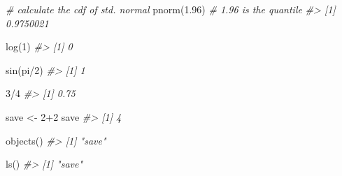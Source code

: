 \documentclass[
]{book}
\newenvironment{Shaded}{\begin{snugshade}}{\end{snugshade}}
\newcommand{\CommentTok}[1]{\textcolor[rgb]{0.56,0.35,0.01}{\textit{#1}}}
\newcommand{\DecValTok}[1]{\textcolor[rgb]{0.00,0.00,0.81}{#1}}
\newcommand{\FloatTok}[1]{\textcolor[rgb]{0.00,0.00,0.81}{#1}}
\newcommand{\FunctionTok}[1]{\textcolor[rgb]{0.00,0.00,0.00}{#1}}
\newcommand{\NormalTok}[1]{#1}
\newcommand{\OtherTok}[1]{\textcolor[rgb]{0.56,0.35,0.01}{#1}}
\newcommand{\SpecialCharTok}[1]{\textcolor[rgb]{0.00,0.00,0.00}{#1}}
\begin{document}
\begin{Shaded}
\begin{Highlighting}[]
\CommentTok{\# calculate the cdf of std. normal}
\FunctionTok{pnorm}\NormalTok{(}\FloatTok{1.96}\NormalTok{) }\CommentTok{\# 1.96 is the quantile}
\CommentTok{\#\textgreater{} [1] 0.9750021}
\end{Highlighting}
\end{Shaded}

\begin{Shaded}
\begin{Highlighting}[]
\FunctionTok{log}\NormalTok{(}\DecValTok{1}\NormalTok{)}
\CommentTok{\#\textgreater{} [1] 0}
\end{Highlighting}
\end{Shaded}

\begin{Shaded}
\begin{Highlighting}[]
\FunctionTok{sin}\NormalTok{(pi}\SpecialCharTok{/}\DecValTok{2}\NormalTok{)}
\CommentTok{\#\textgreater{} [1] 1}
\end{Highlighting}
\end{Shaded}

\begin{Shaded}
\begin{Highlighting}[]
\DecValTok{3}\SpecialCharTok{/}\DecValTok{4}
\CommentTok{\#\textgreater{} [1] 0.75}
\end{Highlighting}
\end{Shaded}

\begin{Shaded}
\begin{Highlighting}[]
\NormalTok{save }\OtherTok{\textless{}{-}} \DecValTok{2}\SpecialCharTok{+}\DecValTok{2}
\NormalTok{save}
\CommentTok{\#\textgreater{} [1] 4}
\end{Highlighting}
\end{Shaded}

\begin{Shaded}
\begin{Highlighting}[]
\FunctionTok{objects}\NormalTok{()}
\CommentTok{\#\textgreater{} [1] "save"}
\end{Highlighting}
\end{Shaded}

\begin{Shaded}
\begin{Highlighting}[]
\FunctionTok{ls}\NormalTok{()}
\CommentTok{\#\textgreater{} [1] "save"}
\end{Highlighting}
\end{Shaded}
\end{document}
